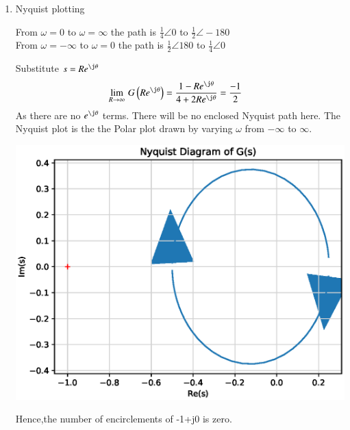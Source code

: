 \begin{enumerate}[label=\thesection.\arabic*.,ref=\thesection.\theenumi]
\item Nyquist plotting\\
\solution

From $\omega = 0$ to $\omega = \infty$ the path is
$\frac{1}{4}\angle0$ to $\frac{1}{2}\angle-180$
\\
From $\omega = -\infty$ to $\omega = 0$ the path is
$\frac{1}{2}\angle180$ to $\frac{1}{4}\angle0$

Substitute $s = Re^{\j\theta}$
\begin{align}
\lim_{R\to \infty}\,G\brak{Re^{\j\theta}} &= \frac{1-Re^{\j\theta}}{4+2Re^{\j\theta}}=\frac{-1}{2}  
\end{align}
As there are no $e^{\j\theta}$ terms.
There will be no enclosed Nyquist path here.
The Nyquist plot is the the Polar plot drawn by varying $\omega$ from $-\infty$ to $\infty$.

\includegraphics[width=\columnwidth]{./figs/ee18btech11034.eps}

Hence,the number of encirclements of -1+j0 is zero.
\end{enumerate}
